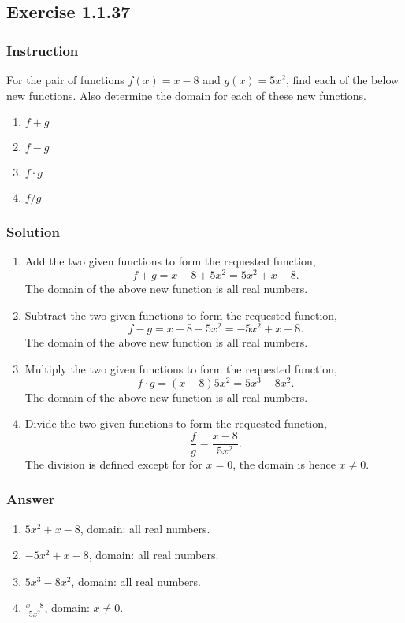 \subsection*{Exercise 1.1.37}

\subsubsection*{Instruction}

For the pair of functions $ f(x) = x - 8 $ and $ g(x) = 5x^2 $, find each of the below new functions. Also determine the domain for each of these new functions.

\begin{enumerate}[label = (\alph*)]
  \item $ f + g $
  \item $ f - g $
  \item $ f \cdot g $
  \item $ f / g $
\end{enumerate}

\subsubsection*{Solution}

\begin{enumerate}[label = (\alph*)]
  \item
    Add the two given functions to form the requested function,
    $$ \phantom{.}
    f + g = x - 8 + 5x^2 = 5x^2 + x - 8
    .$$
    The domain of the above new function is all real numbers.
  \item
    Subtract the two given functions to form the requested function,
    $$ \phantom{.}
    f - g = x - 8 - 5x^2 = -5x^2 + x - 8
    .$$
    The domain of the above new function is all real numbers.
  \item
    Multiply the two given functions to form the requested function,
    $$ \phantom{.}
    f \cdot g = (x - 8)5x^2 = 5x^3 - 8x^2
    .$$
    The domain of the above new function is all real numbers.
  \item
    Divide the two given functions to form the requested function,
    $$ \phantom{.}
    \frac{f}{g} = \frac{x - 8}{5x^2}
    .$$
    The division is defined except for for $ x = 0 $, the domain is hence $ x \neq 0 $.

\end{enumerate}

\subsubsection*{Answer}

\begin{enumerate}[label = (\alph*)]
  \item
    $ 5x^2 + x - 8 $, domain: all real numbers.
  \item
    $ -5x^2 + x - 8 $, domain: all real numbers.
  \item
    $ 5x^3 - 8x^2 $, domain: all real numbers.
  \item
    $ \frac{x - 8}{5x^2} $, domain: $ x \neq 0 $.
\end{enumerate}
